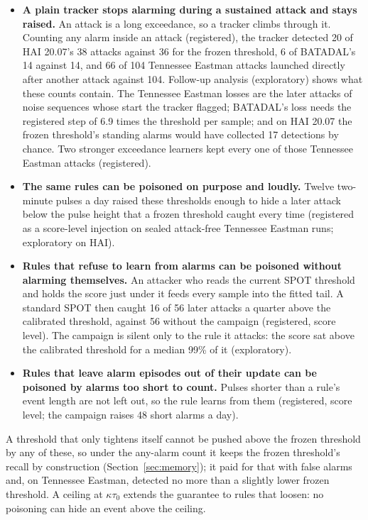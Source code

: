 \documentclass[sigconf]{acmart}
\begin{document}
\begin{itemize}
\item \textbf{A plain tracker stops alarming during a sustained attack and stays raised.} An attack is
  a long exceedance, so a tracker climbs through it. Counting any alarm inside an attack (registered),
  the tracker detected 20 of HAI 20.07's 38 attacks against 36 for the frozen threshold, 6 of BATADAL's
  14 against 14, and 66 of 104 Tennessee Eastman attacks launched directly after another attack against
  104. Follow-up analysis (exploratory) shows what these counts contain. The Tennessee Eastman losses
  are the later attacks of noise sequences whose start the tracker flagged; BATADAL's loss needs the
  registered step of 6.9 times the threshold per sample; and on HAI 20.07 the frozen threshold's
  standing alarms would have collected 17 detections by chance. Two stronger exceedance learners kept
  every one of those Tennessee Eastman attacks (registered).
\item \textbf{The same rules can be poisoned on purpose and loudly.} Twelve two-minute pulses a
  day raised these thresholds enough to hide a later attack below the pulse height that a frozen
  threshold caught every time (registered as a score-level injection on sealed attack-free Tennessee
  Eastman runs; exploratory on HAI).
\item \textbf{Rules that refuse to learn from alarms can be poisoned without alarming themselves.} An
  attacker who reads the current SPOT threshold and holds the score just under it feeds every sample
  into the fitted tail. A standard SPOT then caught 16 of 56 later attacks a quarter above the
  calibrated threshold, against 56 without the campaign (registered, score level). The campaign is
  silent only to the rule it attacks: the score sat above the calibrated threshold for a median 99\%
  of it (exploratory).
\item \textbf{Rules that leave alarm episodes out of their update can be poisoned by alarms too short
  to count.} Pulses shorter than a rule's event length are not left out, so the rule learns from them
  (registered, score level; the campaign raises 48 short alarms a day).
\end{itemize}

A threshold that only tightens itself cannot be pushed above the frozen threshold by any of these, so
under the any-alarm count it keeps the frozen threshold's recall by construction
(Section~\ref{sec:memory}); it paid for that with false alarms and, on Tennessee Eastman, detected no
more than a slightly lower frozen threshold. A ceiling at $\kappa\tau_0$ extends the guarantee to rules
that loosen: no poisoning can hide an event above the ceiling.
\end{document}
